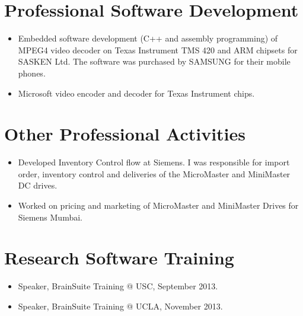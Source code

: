 \documentclass[overlapped,line,letterpaper]{res}
\begin{document}
\begin{resume}
\section{Professional Software Development}
\begin{itemize}
    \item Embedded software development (C++ and assembly programming) of MPEG4 video decoder on Texas Instrument TMS 420 and ARM chipsets for SASKEN Ltd. The software was purchased by SAMSUNG for their mobile phones. 
    \item Microsoft video encoder and decoder for Texas Instrument chips.
    \end{itemize}

\section{Other Professional Activities}
\begin{itemize} 
    \item Developed Inventory Control flow at Siemens. I was responsible for import order, inventory control and deliveries of the MicroMaster and MiniMaster DC drives.
    \item Worked on pricing and marketing of MicroMaster and MiniMaster Drives for Siemens Mumbai.
\end{itemize}

\section{Research Software Training}
\begin{itemize}
\item  Speaker, BrainSuite Training @ USC, September 2013.
\item Speaker, BrainSuite Training @ UCLA, November 2013.
\end{itemize}






\end{resume}
\end{document}
